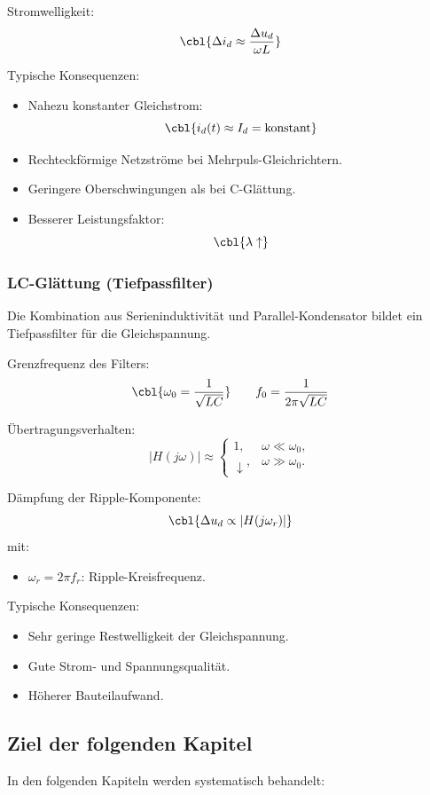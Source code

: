 Stromwelligkeit:
\[
\cbl{\Delta i_d \approx \frac{\Delta u_d}{\omega L}}
\]

Typische Konsequenzen:
\begin{itemize}
\item Nahezu konstanter Gleichstrom:
\[
\cbl{i_d(t) \approx I_d = \text{konstant}}
\]
\item Rechteckförmige Netzströme bei Mehrpuls-Gleichrichtern.
\item Geringere Oberschwingungen als bei C-Glättung.
\item Besserer Leistungsfaktor:
\[
\cbl{\lambda \uparrow}
\]
\end{itemize}

\subsubsection*{LC-Glättung (Tiefpassfilter)}

Die Kombination aus Serieninduktivität und Parallel-Kondensator
bildet ein Tiefpassfilter für die Gleichspannung.

Grenzfrequenz des Filters:
\[
\cbl{\omega_0 = \frac{1}{\sqrt{LC}}}
\qquad
f_0 = \frac{1}{2\pi\sqrt{LC}}
\]

Übertragungsverhalten:
\[
|H(j\omega)| \approx
\begin{cases}
1, & \omega \ll \omega_0, \\
\downarrow, & \omega \gg \omega_0.
\end{cases}
\]

Dämpfung der Ripple-Komponente:
\[
\cbl{\Delta u_d \propto |H(j\omega_r)|}
\]
mit:
\begin{itemize}
\item $\omega_r = 2\pi f_r$: Ripple-Kreisfrequenz.
\end{itemize}

Typische Konsequenzen:
\begin{itemize}
\item Sehr geringe Restwelligkeit der Gleichspannung.
\item Gute Strom- und Spannungsqualität.
\item Höherer Bauteilaufwand.
\end{itemize}


\subsection{Ziel der folgenden Kapitel}

In den folgenden Kapiteln werden systematisch behandelt:


